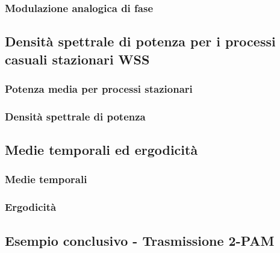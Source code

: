 \documentclass[../main.tex]{subfiles}
\begin{document}
\subsubsection{Modulazione analogica di fase}

\subsection{Densità spettrale di potenza per i processi casuali stazionari WSS}

\subsubsection{Potenza media per processi stazionari}

\subsubsection{Densità spettrale di potenza}

\subsection{Medie temporali ed ergodicità}

\subsubsection{Medie temporali}

\subsubsection{Ergodicità}

\subsection{Esempio conclusivo - Trasmissione 2-PAM}




























\end{document}
